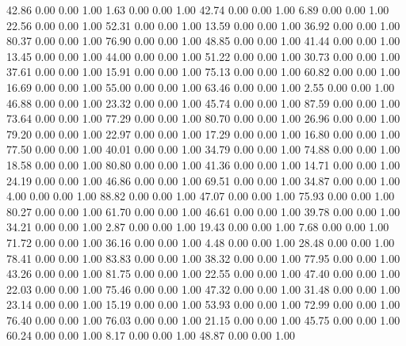   42.86   0.00   0.00   1.00
    1.63   0.00   0.00   1.00
   42.74   0.00   0.00   1.00
    6.89   0.00   0.00   1.00
   22.56   0.00   0.00   1.00
   52.31   0.00   0.00   1.00
   13.59   0.00   0.00   1.00
   36.92   0.00   0.00   1.00
   80.37   0.00   0.00   1.00
   76.90   0.00   0.00   1.00
   48.85   0.00   0.00   1.00
   41.44   0.00   0.00   1.00
   13.45   0.00   0.00   1.00
   44.00   0.00   0.00   1.00
   51.22   0.00   0.00   1.00
   30.73   0.00   0.00   1.00
   37.61   0.00   0.00   1.00
   15.91   0.00   0.00   1.00
   75.13   0.00   0.00   1.00
   60.82   0.00   0.00   1.00
   16.69   0.00   0.00   1.00
   55.00   0.00   0.00   1.00
   63.46   0.00   0.00   1.00
    2.55   0.00   0.00   1.00
   46.88   0.00   0.00   1.00
   23.32   0.00   0.00   1.00
   45.74   0.00   0.00   1.00
   87.59   0.00   0.00   1.00
   73.64   0.00   0.00   1.00
   77.29   0.00   0.00   1.00
   80.70   0.00   0.00   1.00
   26.96   0.00   0.00   1.00
   79.20   0.00   0.00   1.00
   22.97   0.00   0.00   1.00
   17.29   0.00   0.00   1.00
   16.80   0.00   0.00   1.00
   77.50   0.00   0.00   1.00
   40.01   0.00   0.00   1.00
   34.79   0.00   0.00   1.00
   74.88   0.00   0.00   1.00
   18.58   0.00   0.00   1.00
   80.80   0.00   0.00   1.00
   41.36   0.00   0.00   1.00
   14.71   0.00   0.00   1.00
   24.19   0.00   0.00   1.00
   46.86   0.00   0.00   1.00
   69.51   0.00   0.00   1.00
   34.87   0.00   0.00   1.00
    4.00   0.00   0.00   1.00
   88.82   0.00   0.00   1.00
   47.07   0.00   0.00   1.00
   75.93   0.00   0.00   1.00
   80.27   0.00   0.00   1.00
   61.70   0.00   0.00   1.00
   46.61   0.00   0.00   1.00
   39.78   0.00   0.00   1.00
   34.21   0.00   0.00   1.00
    2.87   0.00   0.00   1.00
   19.43   0.00   0.00   1.00
    7.68   0.00   0.00   1.00
   71.72   0.00   0.00   1.00
   36.16   0.00   0.00   1.00
    4.48   0.00   0.00   1.00
   28.48   0.00   0.00   1.00
   78.41   0.00   0.00   1.00
   83.83   0.00   0.00   1.00
   38.32   0.00   0.00   1.00
   77.95   0.00   0.00   1.00
   43.26   0.00   0.00   1.00
   81.75   0.00   0.00   1.00
   22.55   0.00   0.00   1.00
   47.40   0.00   0.00   1.00
   22.03   0.00   0.00   1.00
   75.46   0.00   0.00   1.00
   47.32   0.00   0.00   1.00
   31.48   0.00   0.00   1.00
   23.14   0.00   0.00   1.00
   15.19   0.00   0.00   1.00
   53.93   0.00   0.00   1.00
   72.99   0.00   0.00   1.00
   76.40   0.00   0.00   1.00
   76.03   0.00   0.00   1.00
   21.15   0.00   0.00   1.00
   45.75   0.00   0.00   1.00
   60.24   0.00   0.00   1.00
    8.17   0.00   0.00   1.00
   48.87   0.00   0.00   1.00
